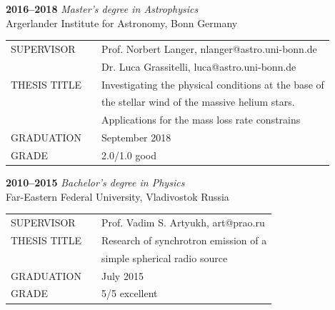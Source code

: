 \documentclass[
openright,
12pt, %
english,%
onehalfspacing, %
nolistspacing, %
nohyperref, %
headsepline, %
]{MastersDoctoralThesis} %
\begin{document}
\noindent \textbf{2016--2018} \textit{Master’s degree in Astrophysics} \\
Argerlander Institute for Astronomy, Bonn Germany \\
\begin{tabular}{l l l}
    \hspace{3mm}S\footnotesize{UPERVISOR}   & \hspace{2mm} & Prof. Norbert Langer, nlanger@astro.uni-bonn.de \\
                                            & \hspace{2mm} & Dr. Luca Grassitelli, luca@astro.uni-bonn.de \\
    \hspace{3mm}T\footnotesize{HESIS TITLE} & \hspace{2mm} & Investigating the physical conditions at the base of \\ 
                                            & \hspace{2mm} & the stellar wind of the massive helium stars. \\ 
                                            & \hspace{2mm} & Applications for the mass loss rate constrains \\
    \hspace{3mm}G\footnotesize{RADUATION}   & \hspace{2mm} & September 2018 \\
    \hspace{3mm}G\footnotesize{RADE}        & \hspace{2mm} & 2.0/1.0 good \\
\end{tabular}

\noindent \textbf{2010--2015} \textit{Bachelor's degree in Physics} \\
Far-Eastern Federal University, Vladivostok Russia \\
\begin{tabular}{l l l}
    \hspace{3mm}S\footnotesize{UPERVISOR}   & \hspace{2mm} & Prof. Vadim S. Artyukh, art@prao.ru \\
    \hspace{3mm}T\footnotesize{HESIS TITLE} & \hspace{2mm} & Research of synchrotron emission of a \\  
                                            & \hspace{2mm} & simple spherical radio source \\
    \hspace{3mm}G\footnotesize{RADUATION}   & \hspace{2mm} & July 2015 \\
    \hspace{3mm}G\footnotesize{RADE}        & \hspace{2mm} & 5/5 excellent \\
\end{tabular}
\end{document}
